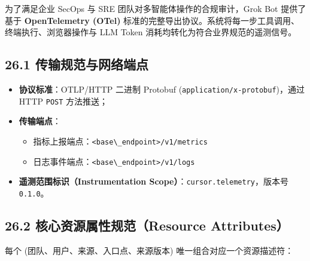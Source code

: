 \documentclass[10.5pt,a4paper,oneside]{report}
\providecommand{\tightlist}{\setlength{\itemsep}{0pt}\setlength{\parskip}{0pt}}
\newcommand{\passthrough}[1]{#1}
\begin{document}
为了满足企业 SecOps 与 SRE 团队对多智能体操作的合规审计，Grok Bot
提供了基于 \textbf{OpenTelemetry (OTel)}
标准的完整导出协议。系统将每一步工具调用、终端执行、浏览器操作与 LLM
Token 消耗均转化为符合业界规范的遥测信号。

\subsection{26.1
传输规范与网络端点}\label{ux4f20ux8f93ux89c4ux8303ux4e0eux7f51ux7edcux7aefux70b9}

\begin{itemize}
\tightlist
\item
  \textbf{协议标准}：OTLP/HTTP 二进制 Protobuf
  (\passthrough{\lstinline!application/x-protobuf!})，通过 HTTP
  \passthrough{\lstinline!POST!} 方法推送；
\item
  \textbf{传输端点}：

  \begin{itemize}
  \tightlist
  \item
    指标上报端点：\passthrough{\lstinline!<base\_endpoint>/v1/metrics!}
  \item
    日志事件端点：\passthrough{\lstinline!<base\_endpoint>/v1/logs!}
  \end{itemize}
\item
  \textbf{遥测范围标识（Instrumentation
  Scope）}：\passthrough{\lstinline!cursor.telemetry!}，版本号
  \passthrough{\lstinline!0.1.0!}。
\end{itemize}

\subsection{26.2 核心资源属性规范（Resource
Attributes）}\label{ux6838ux5fc3ux8d44ux6e90ux5c5eux6027ux89c4ux8303resource-attributes}

每个 (团队、用户、来源、入口点、来源版本) 唯一组合对应一个资源描述符：
\end{document}
